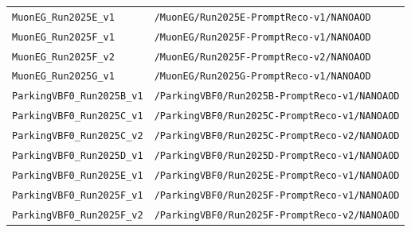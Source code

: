 \begin{longtable}{@{}>{\RaggedRight\arraybackslash}p{} >{\RaggedRight\arraybackslash}p{}@{}}
\addlinespace[2pt]
\texttt{MuonEG\_\allowbreak{}Run2025E\_\allowbreak{}v1} & \texttt{/\allowbreak{}MuonEG/\allowbreak{}Run2025E-\allowbreak{}PromptReco-\allowbreak{}v1/\allowbreak{}NANOAOD} \\
\addlinespace[2pt]
\texttt{MuonEG\_\allowbreak{}Run2025F\_\allowbreak{}v1} & \texttt{/\allowbreak{}MuonEG/\allowbreak{}Run2025F-\allowbreak{}PromptReco-\allowbreak{}v1/\allowbreak{}NANOAOD} \\
\addlinespace[2pt]
\texttt{MuonEG\_\allowbreak{}Run2025F\_\allowbreak{}v2} & \texttt{/\allowbreak{}MuonEG/\allowbreak{}Run2025F-\allowbreak{}PromptReco-\allowbreak{}v2/\allowbreak{}NANOAOD} \\
\addlinespace[2pt]
\texttt{MuonEG\_\allowbreak{}Run2025G\_\allowbreak{}v1} & \texttt{/\allowbreak{}MuonEG/\allowbreak{}Run2025G-\allowbreak{}PromptReco-\allowbreak{}v1/\allowbreak{}NANOAOD} \\
\addlinespace[2pt]
\texttt{ParkingVBF0\_\allowbreak{}Run2025B\_\allowbreak{}v1} & \texttt{/\allowbreak{}ParkingVBF0/\allowbreak{}Run2025B-\allowbreak{}PromptReco-\allowbreak{}v1/\allowbreak{}NANOAOD} \\
\addlinespace[2pt]
\texttt{ParkingVBF0\_\allowbreak{}Run2025C\_\allowbreak{}v1} & \texttt{/\allowbreak{}ParkingVBF0/\allowbreak{}Run2025C-\allowbreak{}PromptReco-\allowbreak{}v1/\allowbreak{}NANOAOD} \\
\addlinespace[2pt]
\texttt{ParkingVBF0\_\allowbreak{}Run2025C\_\allowbreak{}v2} & \texttt{/\allowbreak{}ParkingVBF0/\allowbreak{}Run2025C-\allowbreak{}PromptReco-\allowbreak{}v2/\allowbreak{}NANOAOD} \\
\addlinespace[2pt]
\texttt{ParkingVBF0\_\allowbreak{}Run2025D\_\allowbreak{}v1} & \texttt{/\allowbreak{}ParkingVBF0/\allowbreak{}Run2025D-\allowbreak{}PromptReco-\allowbreak{}v1/\allowbreak{}NANOAOD} \\
\addlinespace[2pt]
\texttt{ParkingVBF0\_\allowbreak{}Run2025E\_\allowbreak{}v1} & \texttt{/\allowbreak{}ParkingVBF0/\allowbreak{}Run2025E-\allowbreak{}PromptReco-\allowbreak{}v1/\allowbreak{}NANOAOD} \\
\addlinespace[2pt]
\texttt{ParkingVBF0\_\allowbreak{}Run2025F\_\allowbreak{}v1} & \texttt{/\allowbreak{}ParkingVBF0/\allowbreak{}Run2025F-\allowbreak{}PromptReco-\allowbreak{}v1/\allowbreak{}NANOAOD} \\
\addlinespace[2pt]
\texttt{ParkingVBF0\_\allowbreak{}Run2025F\_\allowbreak{}v2} & \texttt{/\allowbreak{}ParkingVBF0/\allowbreak{}Run2025F-\allowbreak{}PromptReco-\allowbreak{}v2/\allowbreak{}NANOAOD} \\

\end{longtable}
